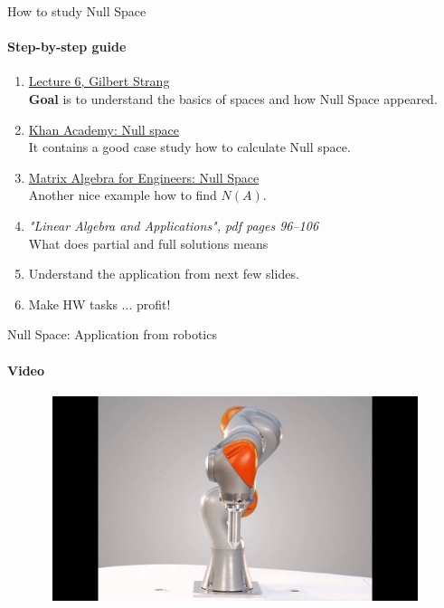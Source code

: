 \documentclass[aspectratio=169]{beamer}
\begin{document}
\begin{frame}[t]{How to study Null Space}
    \framesubtitle{Step-by-step guide}
    \vspace{-0.3cm}
    \begin{enumerate}
        \item \href{https://youtu.be/8o5Cmfpeo6g}{Lecture 6, Gilbert Strang} \\ \textbf{Goal} is to understand the basics of spaces and how Null Space appeared.
        \item \href{https://www.youtube.com/watch?v=_uTAdf_AsfQ}{Khan Academy: Null space} \\ It contains a good case study how to calculate Null space.
        \item \href{https://www.youtube.com/watch?v=C8zOd07U3l8}{Matrix Algebra for Engineers: Null Space} \\ Another nice example how to find $N(A)$.
        \item \textit{"Linear Algebra and Applications", pdf pages 96--106 } \\ What does partial and full solutions means
        \item Understand the application from next few slides.
        \item Make HW tasks ... profit!
    \end{enumerate}
\end{frame}

\begin{frame}[t]{Null Space: Application from robotics}
    \framesubtitle{Video}
    \vspace{-0.6cm}
    \begin{figure}[H]
        \href{https://youtu.be/sZYBC8Lrmdo}{
            \centering\includegraphics[height=6cm,width=1\textwidth,keepaspectratio]{kuka.jpg}}
        \label{fig:kuka.jpg}
    \end{figure}
\end{frame}
\end{document}
